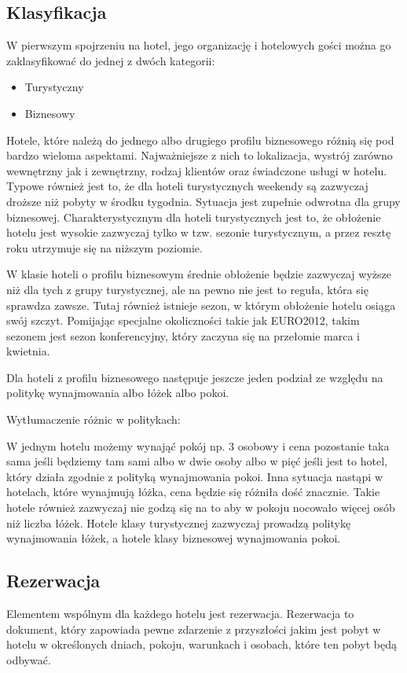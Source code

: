 \documentclass[a4paper,onecolumn,oneside,11pt,wide,floatssmall]{mwrep}
\theoremstyle{definition}
\theoremstyle{plain}%
\theoremstyle{remark}
\begin{document}
\subsection{Klasyfikacja}
W pierwszym spojrzeniu na hotel, jego organizację i hotelowych gości można go
zaklasyfikować do jednej z dwóch kategorii:
\begin{itemize}
  \item Turystyczny
  \item Biznesowy 
\end{itemize}

Hotele, które należą do jednego albo drugiego profilu biznesowego różnią się pod
bardzo wieloma aspektami. Najważniejsze z nich to lokalizacja, wystrój
zarówno wewnętrzny jak i zewnętrzny, rodzaj klientów oraz świadczone usługi
w hotelu. Typowe również jest to, że dla hoteli turystycznych weekendy są zazwyczaj
 droższe niż pobyty w środku tygodnia. Sytuacja jest zupełnie odwrotna dla grupy
 biznesowej. Charakterystycznym dla hoteli turystycznych jest to, że obłożenie
 hotelu jest wysokie zazwyczaj tylko w tzw. sezonie turystycznym, a przez resztę
 roku utrzymuje się na niższym poziomie.
 
 W klasie hoteli o profilu biznesowym średnie obłożenie będzie zazwyczaj wyższe
 niż dla tych z grupy turystycznej, ale na pewno nie jest to reguła, która się
  sprawdza zawsze. Tutaj również istnieje sezon, w którym obłożenie hotelu
  osiąga swój szczyt. Pomijając specjalne okoliczności takie jak EURO2012, takim
  sezonem jest sezon konferencyjny, który zaczyna się na przełomie marca i kwietnia.
  
  Dla hoteli z profilu biznesowego następuje 
 jeszcze jeden podział ze względu na politykę wynajmowania albo łóżek albo pokoi.
   
 Wytłumaczenie różnic w politykach:
 
 W jednym hotelu możemy wynająć pokój np.
 3 osobowy i cena pozostanie taka sama jeśli będziemy tam sami albo w dwie osoby albo w pięć jeśli jest to hotel,
  który działa zgodnie z polityką wynajmowania pokoi. Inna sytuacja nastąpi w hotelach, które wynajmują łóżka,
   cena będzie się różniła dość znacznie. Takie hotele również
   zazwyczaj nie godzą się na to aby w pokoju nocowało więcej osób niż liczba łóżek. 
   Hotele klasy turystycznej zazwyczaj prowadzą politykę wynajmowania łóżek, a hotele klasy biznesowej wynajmowania pokoi.

\subsection{Rezerwacja}
Elementem wspólnym dla każdego hotelu jest rezerwacja.
Rezerwacja to dokument, który zapowiada pewne zdarzenie
z przyszłości jakim jest pobyt w hotelu w określonych dniach,
pokoju, warunkach i osobach, które ten pobyt będą odbywać.
\end{document}
